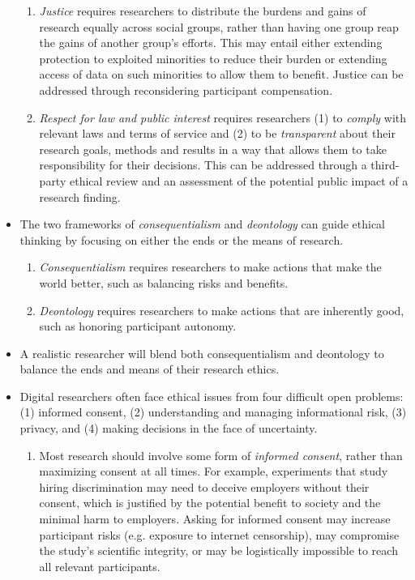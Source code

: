 \documentclass[11pt,letterpaper]{article}
\begin{document}
\begin{itemize}
\begin{enumerate}
\item \emph{Justice} requires researchers to distribute the burdens and gains of research equally across social groups, rather than having one group reap the gains of another group's efforts. This may entail either extending protection to exploited minorities to reduce their burden or extending access of data on such minorities to allow them to benefit. Justice can be addressed through reconsidering participant compensation.
\item \emph{Respect for law and public interest} requires researchers (1) to \emph{comply} with relevant laws and terms of service and (2) to be \emph{transparent} about their research goals, methods and results in a way that allows them to take responsibility for their decisions. This can be addressed through a third-party ethical review and an assessment of the potential public impact of a research finding.
\end{enumerate}
\item The two frameworks of \emph{consequentialism} and \emph{deontology} can guide ethical thinking by focusing on either the ends or the means of research. 
\begin{enumerate}
\item \emph{Consequentialism} requires researchers to make actions that make the world better, such as balancing risks and benefits.
\item \emph{Deontology} requires researchers to make actions that are inherently good, such as honoring participant autonomy.
\end{enumerate}
\item A realistic researcher will blend both consequentialism and deontology to balance the ends and means of their research ethics.
\item Digital researchers often face ethical issues from four difficult open problems: (1) informed consent, (2) understanding and managing informational risk, (3) privacy, and (4) making decisions in the face of uncertainty.
\begin{enumerate}
\item Most research should involve some form of \emph{informed consent}, rather than maximizing consent at all times. For example, experiments that study hiring discrimination may need to deceive employers without their consent, which is justified by the potential benefit to society and the minimal harm to employers. Asking for informed consent may increase participant risks (e.g. exposure to internet censorship), may compromise the study's scientific integrity, or may be logistically impossible to reach all relevant participants.

\end{enumerate}
\end{itemize}
\end{document}
